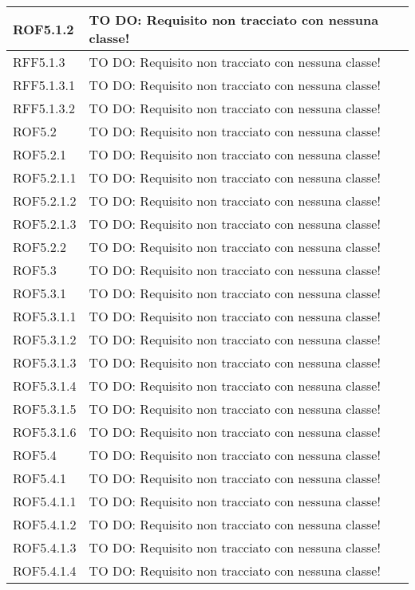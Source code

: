 \begin{center}
\begin{longtable}{| p{4cm} | p{8cm} |}
ROF5.1.2 & TO DO: Requisito non tracciato con nessuna classe! \\
\hline
RFF5.1.3 & TO DO: Requisito non tracciato con nessuna classe! \\
\hline
RFF5.1.3.1 & TO DO: Requisito non tracciato con nessuna classe! \\
\hline
RFF5.1.3.2 & TO DO: Requisito non tracciato con nessuna classe! \\
\hline
ROF5.2 & TO DO: Requisito non tracciato con nessuna classe! \\
\hline
ROF5.2.1 & TO DO: Requisito non tracciato con nessuna classe! \\
\hline
ROF5.2.1.1 & TO DO: Requisito non tracciato con nessuna classe! \\
\hline
ROF5.2.1.2 & TO DO: Requisito non tracciato con nessuna classe! \\
\hline
ROF5.2.1.3 & TO DO: Requisito non tracciato con nessuna classe! \\
\hline
ROF5.2.2 & TO DO: Requisito non tracciato con nessuna classe! \\
\hline
ROF5.3 & TO DO: Requisito non tracciato con nessuna classe! \\
\hline
ROF5.3.1 & TO DO: Requisito non tracciato con nessuna classe! \\
\hline
ROF5.3.1.1 & TO DO: Requisito non tracciato con nessuna classe! \\
\hline
ROF5.3.1.2 & TO DO: Requisito non tracciato con nessuna classe! \\
\hline
ROF5.3.1.3 & TO DO: Requisito non tracciato con nessuna classe! \\
\hline
ROF5.3.1.4 & TO DO: Requisito non tracciato con nessuna classe! \\
\hline
ROF5.3.1.5 & TO DO: Requisito non tracciato con nessuna classe! \\
\hline
ROF5.3.1.6 & TO DO: Requisito non tracciato con nessuna classe! \\
\hline
ROF5.4 & TO DO: Requisito non tracciato con nessuna classe! \\
\hline
ROF5.4.1 & TO DO: Requisito non tracciato con nessuna classe! \\
\hline
ROF5.4.1.1 & TO DO: Requisito non tracciato con nessuna classe! \\
\hline
ROF5.4.1.2 & TO DO: Requisito non tracciato con nessuna classe! \\
\hline
ROF5.4.1.3 & TO DO: Requisito non tracciato con nessuna classe! \\
\hline
ROF5.4.1.4 & TO DO: Requisito non tracciato con nessuna classe! \\

\end{longtable}
\end{center}
